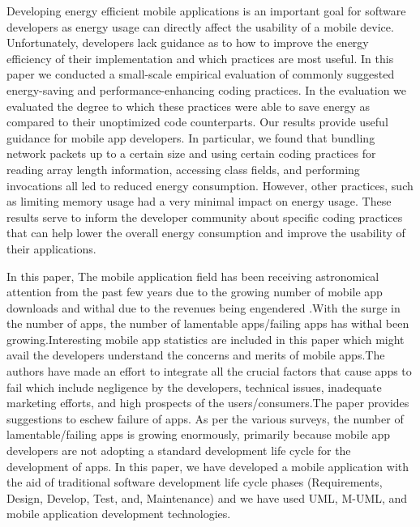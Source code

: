 \documentclass{article}
\begin{document}
\medskip

Developing energy efficient mobile applications is an important goal for software developers as energy usage can directly affect the usability of a mobile device. Unfortunately,
developers lack guidance as to how to improve the energy
efficiency of their implementation and which practices are
most useful. In this paper we conducted a small-scale empirical evaluation of commonly suggested energy-saving and
performance-enhancing coding practices. In the evaluation
we evaluated the degree to which these practices were able
to save energy as compared to their unoptimized code counterparts. Our results provide useful guidance for mobile app
developers. In particular, we found that bundling network
packets up to a certain size and using certain coding practices for reading array length information, accessing class
fields, and performing invocations all led to reduced energy
consumption. However, other practices, such as limiting
memory usage had a very minimal impact on energy usage. These results serve to inform the developer community
about specific coding practices that can help lower the overall energy consumption and improve the usability of their
applications. \cite{li2014investigation}

\medskip

In this paper, The mobile application field has been receiving astronomical attention from the
past few years due to the growing number of mobile app downloads and withal due to the
revenues being engendered .With the surge in the number of apps, the number of lamentable
apps/failing apps has withal been growing.Interesting mobile app statistics are included in this
paper which might avail the developers understand the concerns and merits of mobile apps.The
authors have made an effort to integrate all the crucial factors that cause apps to fail which
include negligence by the developers, technical issues, inadequate marketing efforts, and high
prospects of the users/consumers.The paper provides suggestions to eschew failure of apps. As
per the various surveys, the number of lamentable/failing apps is growing enormously, primarily
because mobile app developers are not adopting a standard development life cycle for the
development of apps. In this paper, we have developed a mobile application with the aid of
traditional software development life cycle phases (Requirements, Design, Develop, Test, and,
Maintenance) and we have used UML, M-UML, and mobile application development
technologies. \cite{inukollu2014factors}
\end{document}
